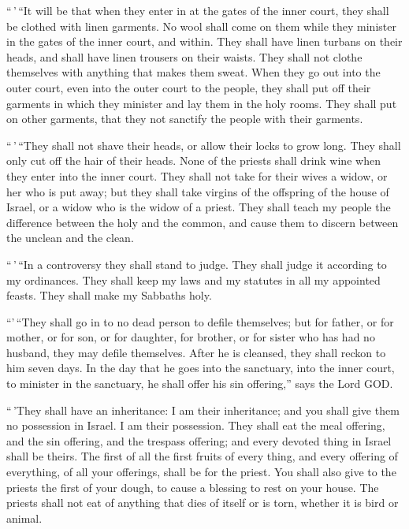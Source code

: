  ``\,'\,``It will be that when they enter in at the gates
of the inner court, they shall be clothed with linen garments. No wool
shall come on them while they minister in the gates of the inner court,
and within.  They shall have linen turbans on their
heads, and shall have linen trousers on their waists. They shall not
clothe themselves with anything that makes them sweat. 
When they go out into the outer court, even into the outer court to the
people, they shall put off their garments in which they minister and lay
them in the holy rooms. They shall put on other garments, that they not
sanctify the people with their garments.

 ``\,'\,``They shall not shave their heads, or allow
their locks to grow long. They shall only cut off the hair of their
heads.  None of the priests shall drink wine when they
enter into the inner court.  They shall not take for
their wives a widow, or her who is put away; but they shall take virgins
of the offspring of the house of Israel, or a widow who is the widow of
a priest.  They shall teach my people the difference
between the holy and the common, and cause them to discern between the
unclean and the clean.

 ``\,'\,``In a controversy they shall stand to judge.
They shall judge it according to my ordinances. They shall keep my laws
and my statutes in all my appointed feasts. They shall make my Sabbaths
holy.

 ``'\,``They shall go in to no dead person to defile
themselves; but for father, or for mother, or for son, or for daughter,
for brother, or for sister who has had no husband, they may defile
themselves.  After he is cleansed, they shall reckon to
him seven days.  In the day that he goes into the
sanctuary, into the inner court, to minister in the sanctuary, he shall
offer his sin offering,'' says the Lord GOD.

 ``\,'They shall have an inheritance: I am their
inheritance; and you shall give them no possession in Israel. I am their
possession.  They shall eat the meal offering, and the
sin offering, and the trespass offering; and every devoted thing in
Israel shall be theirs.  The first of all the first
fruits of every thing, and every offering of everything, of all your
offerings, shall be for the priest. You shall also give to the priests
the first of your dough, to cause a blessing to rest on your house.
 The priests shall not eat of anything that dies of
itself or is torn, whether it is bird or animal.

